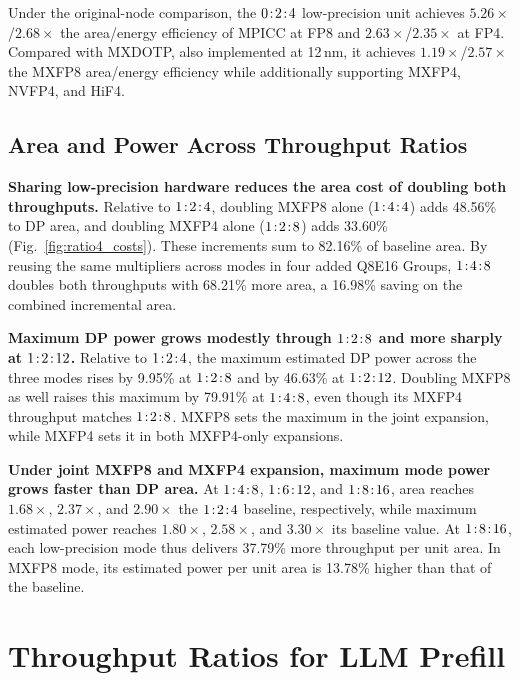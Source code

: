 \documentclass[conference,10pt,letterpaper]{IEEEtran}
\DeclareRobustCommand{\tpratio}[3]{\ensuremath{#1\mkern2mu{:}\mkern2mu#2\mkern2mu{:}\mkern2mu#3}}
\begin{document}
Under the original-node comparison, the \tpratio{0}{2}{4} low-precision unit achieves $5.26\times$/$2.68\times$ the area/energy efficiency of MPICC at FP8 and $2.63\times$/$2.35\times$ at FP4. Compared with MXDOTP, also implemented at 12\,nm, it achieves $1.19\times$/$2.57\times$ the MXFP8 area/energy efficiency while additionally supporting MXFP4, NVFP4, and HiF4.

\subsection{Area and Power Across Throughput Ratios}
\label{sec:lowp_costs}

\textbf{Sharing low-precision hardware reduces the area cost of doubling both throughputs.} Relative to \tpratio{1}{2}{4}, doubling MXFP8 alone (\tpratio{1}{4}{4}) adds 48.56\% to DP area, and doubling MXFP4 alone (\tpratio{1}{2}{8}) adds 33.60\% (Fig.~\ref{fig:ratio4_costs}). These increments sum to 82.16\% of baseline area. By reusing the same multipliers across modes in four added Q8E16 Groups, \tpratio{1}{4}{8} doubles both throughputs with 68.21\% more area, a 16.98\% saving on the combined incremental area.

\textbf{Maximum DP power grows modestly through \tpratio{1}{2}{8} and more sharply at \tpratio{1}{2}{12}.} Relative to \tpratio{1}{2}{4}, the maximum estimated DP power across the three modes rises by 9.95\% at \tpratio{1}{2}{8} and by 46.63\% at \tpratio{1}{2}{12}. Doubling MXFP8 as well raises this maximum by 79.91\% at \tpratio{1}{4}{8}, even though its MXFP4 throughput matches \tpratio{1}{2}{8}. MXFP8 sets the maximum in the joint expansion, while MXFP4 sets it in both MXFP4-only expansions.

\textbf{Under joint MXFP8 and MXFP4 expansion, maximum mode power grows faster than DP area.} At \tpratio{1}{4}{8}, \tpratio{1}{6}{12}, and \tpratio{1}{8}{16}, area reaches $1.68\times$, $2.37\times$, and $2.90\times$ the \tpratio{1}{2}{4} baseline, respectively, while maximum estimated power reaches $1.80\times$, $2.58\times$, and $3.30\times$ its baseline value. At \tpratio{1}{8}{16}, each low-precision mode thus delivers 37.79\% more throughput per unit area. In MXFP8 mode, its estimated power per unit area is 13.78\% higher than that of the baseline.


\section{Throughput Ratios for LLM Prefill}
\label{sec:workload}
\end{document}
